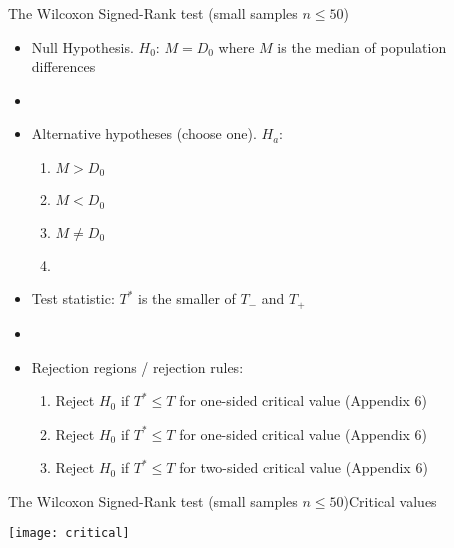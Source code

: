 \documentclass[xcolor=dvipsnames]{beamer}
\begin{document}
\begin{frame}{The Wilcoxon Signed-Rank test (small samples $n\leq 50$)}
		\begin{itemize}
		\item Null Hypothesis. $H_0$: $M=D_0$ where $M$ is the median of population differences \pause
		\item[]
		\item Alternative hypotheses (choose one). $H_a$: \pause
		\begin{enumerate}
			\item $M > D_0$
			\item $M < D_0$
			\item $M \neq D_0$
			\item[]
		\end{enumerate} \pause
		\item Test statistic: $T^*$ is the smaller of $T_-$ and $T_+$ \pause
		\item[]
		\item Rejection regions / rejection rules: \pause
		\begin{enumerate}
			\item Reject $H_0$ if $T^* \leq T$ for one-sided critical value (Appendix 6)
			\item Reject $H_0$ if $T^* \leq T$ for one-sided critical value (Appendix 6)
			\item Reject $H_0$ if $T^* \leq T$ for two-sided critical value (Appendix 6)
		\end{enumerate}
	\end{itemize}
\end{frame}

\begin{frame}{The Wilcoxon Signed-Rank test (small samples $n\leq 50$)}{Critical values}
	\begin{center}
		\texttt{[image: critical]}
	\end{center}
\end{frame}
\end{document}
